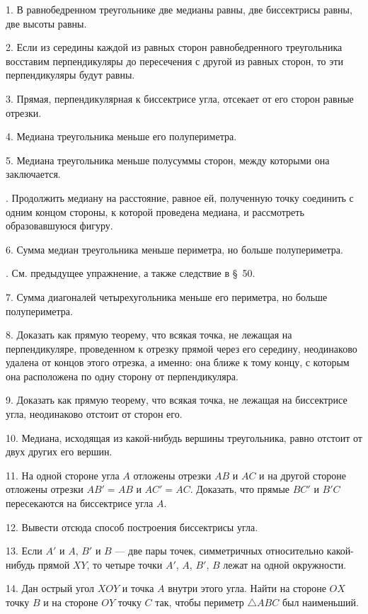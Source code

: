 \documentclass[oneside]{book}
\begin{document}

1.
В равнобедренном треугольнике две медианы равны, две биссектрисы равны, две высоты равны.

2.
Если из середины каждой из равных сторон равнобедренного треугольника восставим перпендикуляры до пересечения с другой из равных сторон, то эти перпендикуляры будут равны.

3.
Прямая, перпендикулярная к биссектрисе угла, отсекает от его сторон равные отрезки.

4.
Медиана треугольника меньше его полупериметра.

5.
Медиана треугольника меньше полусуммы сторон, между которыми она заключается.

.
Продолжить медиану на расстояние, равное ей, полученную точку соединить с одним концом стороны, к которой проведена медиана, и рассмотреть образовавшуюся фигуру.

6.
Сумма медиан треугольника меньше периметра, но больше полупериметра.

.
См.
предыдущее упражнение, а также следствие в §~50.

7.
Сумма диагоналей четырехугольника меньше его периметра, но больше полупериметра.

8.
Доказать как прямую теорему, что всякая точка, не лежащая на перпендикуляре, проведенном к отрезку прямой через его середину, неодинаково удалена от концов этого отрезка, а именно:
она ближе к тому концу, с которым она расположена по одну сторону от перпендикуляра.

9.
Доказать как прямую теорему, что всякая точка, не лежащая на биссектрисе угла, неодинаково отстоит от сторон его.

10.
Медиана, исходящая из какой-нибудь вершины треугольника, равно отстоит от двух других его вершин.

11.
На одной стороне угла $A$ отложены отрезки $AB$ и $AC$ и на другой стороне отложены отрезки $AB'=AB$ и $AC' = AC$.
Доказать, что прямые $BC'$ и $B'C$ пересекаются на биссектрисе угла $A$.

12.
Вывести отсюда способ построения биссектрисы угла.

13.
Если $A'$ и $A$, $B'$ и $B$ — две пары точек, симметричных относительно какой-нибудь прямой $XY$, то четыре точки $A'$, $A$, $B'$, $B$ лежат на одной окружности.

14.
Дан острый угол $XOY$ и точка $A$ внутри этого угла.
Найти на стороне $OX$ точку $B$ и на стороне $OY$ точку $C$ так, чтобы периметр $\triangle ABC$ был наименьший.
\end{document}
